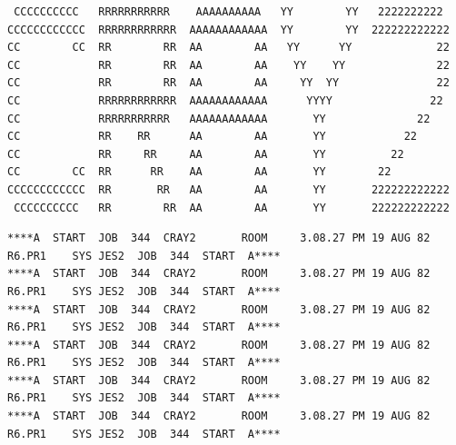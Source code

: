 \handwritten{\[
\left\{\begin{aligned}M'\cap P&=2P\\M'\cap Q&=2Q\end{aligned}\right.
\qquad\text{i.e. }\underset{=(M'\cap P)+2Q}{\underbrace{M'\cap(P+2Q)}}=2P+2Q
\]}

{\scriptsize
\begin{verbatim}
 CCCCCCCCCC   RRRRRRRRRRR    AAAAAAAAAA   YY        YY   2222222222
CCCCCCCCCCCC  RRRRRRRRRRRR  AAAAAAAAAAAA  YY        YY  222222222222
CC        CC  RR        RR  AA        AA   YY      YY             22
CC            RR        RR  AA        AA    YY    YY              22
CC            RR        RR  AA        AA     YY  YY               22
CC            RRRRRRRRRRRR  AAAAAAAAAAAA      YYYY               22
CC            RRRRRRRRRRR   AAAAAAAAAAAA       YY              22
CC            RR    RR      AA        AA       YY            22
CC            RR     RR     AA        AA       YY          22
CC        CC  RR      RR    AA        AA       YY        22
CCCCCCCCCCCC  RR       RR   AA        AA       YY       222222222222
 CCCCCCCCCC   RR        RR  AA        AA       YY       222222222222
\end{verbatim}
}

\handwritten{\[
\begin{aligned}
&m\subset\underset p{\underbrace{P/2P}}\times\underset q{\underbrace{Q/2Q}}\\
&\hspace{4em}\text{sous-module}\\
&\hspace{6em}\text{de }k/2k\text{-module}\\
&m\cap p=0\qquad m\to p\ \text{injectif}\\
&m\cap q=0\qquad m\to q\ \text{injectif}
\end{aligned}
\]}

{\tiny
\begin{verbatim}
****A  START  JOB  344  CRAY2       ROOM     3.08.27 PM 19 AUG 82  R6.PR1    SYS JES2  JOB  344  START  A****
****A  START  JOB  344  CRAY2       ROOM     3.08.27 PM 19 AUG 82  R6.PR1    SYS JES2  JOB  344  START  A****
****A  START  JOB  344  CRAY2       ROOM     3.08.27 PM 19 AUG 82  R6.PR1    SYS JES2  JOB  344  START  A****
****A  START  JOB  344  CRAY2       ROOM     3.08.27 PM 19 AUG 82  R6.PR1    SYS JES2  JOB  344  START  A****
****A  START  JOB  344  CRAY2       ROOM     3.08.27 PM 19 AUG 82  R6.PR1    SYS JES2  JOB  344  START  A****
****A  START  JOB  344  CRAY2       ROOM     3.08.27 PM 19 AUG 82  R6.PR1    SYS JES2  JOB  344  START  A****
\end{verbatim}
}

